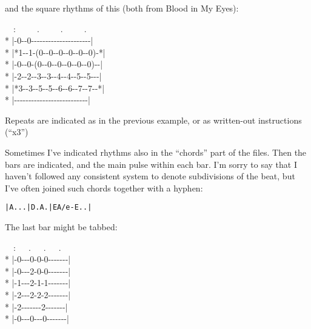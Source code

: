 and the square rhythms of this (both from Blood in My Eyes):

\begin{pre}
\begin{adjustwidth}{2em}{0em}
~~:~~~~~.~~~~~.~~~~~.\\*
|{-}0{-}{-}0{-}{-}{-}{-}{-}{-}{-}{-}{-}{-}{-}{-}{-}{-}{-}{-}{-}{-}{-}{-}{-}|\\*
|*1{-}{-}1{-}(0{-}{-}0{-}{-}0{-}{-}0{-}{-}0{-}{-}0){-}*|\\*
|{-}0{-}{-}0{-}(0{-}{-}0{-}{-}0{-}{-}0{-}{-}0{-}{-}0){-}{-}|\\*
|{-}2{-}{-}2{-}{-}3{-}{-}3{-}{-}4{-}{-}4{-}{-}5{-}{-}5{-}{-}{-}|\\*
|*3{-}{-}3{-}{-}5{-}{-}5{-}{-}6{-}{-}6{-}{-}7{-}{-}7{-}{-}*|\\*
|{-}{-}{-}{-}{-}{-}{-}{-}{-}{-}{-}{-}{-}{-}{-}{-}{-}{-}{-}{-}{-}{-}{-}{-}{-}{-}|
\end{adjustwidth}
\end{pre}

Repeats are indicated as in the previous example, or as written-out instructions
(``x3'')

Sometimes I've indicated rhythms also in the ``{}chords''{} part of
the files. Then the bars are indicated, and the main pulse within each
bar. I'm sorry to say that I haven't followed any consistent system to
denote subdivisions of the beat, but I've often joined such chords
together with a hyphen:

\begin{alltt}| A . . . | D . A . |E A/e-E . . |\end{alltt}

The last bar might be tabbed:

\begin{pre}
\begin{adjustwidth}{2em}{0em}
~~:~~~.~~~.~~~.\\*
|{-}0{-}{-}{-}0{-}0{-}0{-}{-}{-}{-}{-}{-}{-}|\\*
|{-}0{-}{-}{-}2{-}0{-}0{-}{-}{-}{-}{-}{-}{-}|\\*
|{-}1{-}{-}{-}2{-}1{-}1{-}{-}{-}{-}{-}{-}{-}|\\*
|{-}2{-}{-}{-}2{-}2{-}2{-}{-}{-}{-}{-}{-}{-}|\\*
|{-}2{-}{-}{-}{-}{-}{-}{-}2{-}{-}{-}{-}{-}{-}{-}|\\*
|{-}0{-}{-}{-}0{-}{-}{-}0{-}{-}{-}{-}{-}{-}{-}|
\end{adjustwidth}
\end{pre}

